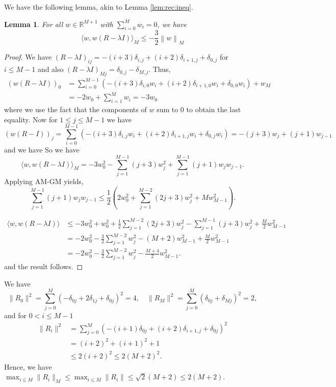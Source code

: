 \documentclass[12pt]{amsart}
\newtheorem{lemma}[theorem]{Lemma}
\theoremstyle{definition}
\theoremstyle{remark}
\newcommand{\norm}[1]{\left\lVert#1\right\rVert}
\newcommand{\RR}{\mathbb{R}}
\begin{document}
We have the following lemma, akin to Lemma \ref{lem:rec:ineq}.
\begin{lemma}\label{lemma_plane_trees}
    For all $w \in \RR^{M+1}$ with $\sum_{i=0}^Mw_i =0$, we have 
    \[
    \langle w, w(R- \lambda I)\rangle_M \le -\frac{3}{2}\norm{w}_M
    \]
\end{lemma}
\begin{proof}
    We have $(R-\lambda I)_{ij} = -(i+3)\delta_{i,j} +(i+2)\delta_{i+1,j}+\delta_{0,j}$ for  $i\le M-1$ and also $(R-\lambda I)_{Mj}=\delta_{0,j}-\delta_{M,j}$.
 Thus, 
 \begin{align*}
       (w(R- \lambda I))_0& =\sum_{i=0}^{M-1}(-(i+3)\delta_{i,0}w_i +(i+2)\delta_{i+1,0}w_i+\delta_{0,0}w_i) +w_M\\& = -2w_0+\sum_{i=1}^Mw_i =-3w_0
 \end{align*}
    where we use the fact that the components of $w$ sum to 0 to obtain the last equality. Now for $1\le j\le M-1$ we have 
    \[
    (w(R- I))_j = \sum_{i=0}^{M-1}(-(i+3)\delta_{i,j}w_i +(i+2)\delta_{i+1,j}w_i+\delta_{0,j}w_i)   = -(j+3)w_j+(j+1)w_{j-1}
    \]
    and we have 
    So we have 
    \[
    \langle w, w(R- \lambda I)\rangle_M =-3w_0^2 - \sum_{j=1}^{M-1}(j+3)w_j^2 +  \sum_{j=1}^{M-1}(j+1)w_{j}w_{j-1}. 
    \]
Applying AM-GM yields,
\[
\sum_{j=1}^{M-1} (j+1)w_jw_{j-1} \leq \frac{1}{2}\left(2w_0^2 + \sum_{j=1}^{M-2}(2j+3)w_j^2 + Mw_{M-1}^2\right).
\]

\begin{align*}
\langle w, w(R- \lambda I)\rangle &\leq  -3w_0^2 + w_0^2 +\frac{1}{2}\sum_{j=1}^{M-2}(2j+3)w_j^2 - \sum_{j=1}^{M-1} (j+3)w_j^2+ \frac{M}{2}w_{M-1}^2 \\
&= -2w_0^2-\frac{3}{2} \sum_{j=1}^{M-2}w_j^2-(M+2)w_{M-1}^2+ \frac{M}{2}w_{M-1}^2\\
&= -2w_0^2-\frac{3}{2} \sum_{j=1}^{M-2}w_j^2-\frac{M+4}{2}w_{M-1}^2 .
\end{align*}
and the result follows.
\end{proof} 
We have
\[
\|R_0\|^2=\sum_{j=0}^M(-\delta_{0j} + 2\delta_{1j} + \delta_{0j})^2 =4, \quad \|R_M\|^2=\sum_{j=0}^M(\delta_{0j}+\delta_{Mj})^2=2,
\]
and for $0<i\leq M-1$
\begin{align*}
    \|R_i\|^2&=\sum_{j=0}^M(-(i+1)\delta_{0j} + (i+2)\delta_{i+1,j} +\delta_{0j})^2\\
    &=(i+2)^2+(i+1)^2+1\\
    &\leq 2(i+2)^2\leq 2(M+2)^2.
\end{align*}
Hence, we have $\max_{i\leq M}\|R_i\|_M\leq\max_{i\leq M}\|R_i\|\leq \sqrt{2}(M+2)\leq 2(M+2)$.\\
\end{document}
